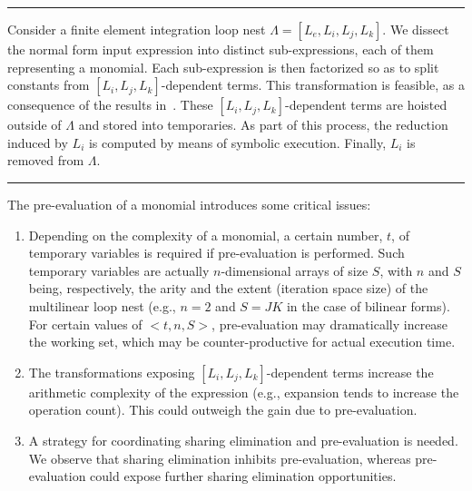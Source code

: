 \noindent\rule[0.01ex]{\linewidth}{0.7pt}

\begin{Algo}
\label{algo:pre-evaluation}
\normalfont
Consider a finite element integration loop nest $\Lambda = [L_e, L_i, L_j, L_k]$. We dissect the normal form input expression into distinct sub-expressions, each of them representing a monomial. Each sub-expression is then factorized so as to split constants from $[L_i, L_j, L_k]$-dependent terms. This transformation is feasible\footnotemark, as a consequence of the results in~\cite{Kirby:TC}. These $[L_i, L_j, L_k]$-dependent terms are hoisted outside of $\Lambda$ and stored into temporaries. As part of this process, the reduction induced by $L_i$ is computed by means of symbolic execution. Finally, $L_i$ is removed from $\Lambda$. 
\end{Algo}


\noindent\rule[1.0ex]{\linewidth}{0.7pt}

The pre-evaluation of a monomial introduces some critical issues:
\begin{enumerate}
\item Depending on the complexity of a monomial, a certain number, $t$, of temporary variables is required if pre-evaluation is performed. Such temporary variables are actually $n$-dimensional arrays of size $S$, with $n$ and $S$ being, respectively, the arity and the extent (iteration space size) of the multilinear loop nest (e.g., $n=2$ and $S = J K$ in the case of bilinear forms). For certain values of ${<}t, n, S{>}$, pre-evaluation may dramatically increase the working set, which may be counter-productive for actual execution time.
\item The transformations exposing $[L_i, L_j, L_k]$-dependent terms increase the arithmetic complexity of the expression (e.g., expansion tends to increase the operation count). This could outweigh the gain due to pre-evaluation.
\item A strategy for coordinating sharing elimination and pre-evaluation is needed. We observe that sharing elimination inhibits pre-evaluation, whereas pre-evaluation could expose further sharing elimination opportunities.
\end{enumerate}

